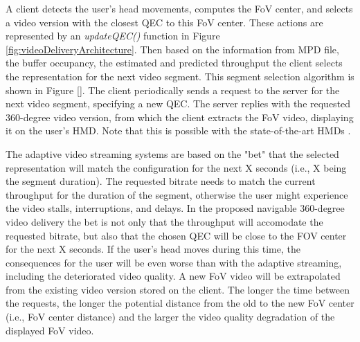 



A client detects the user's head movements, computes the FoV center, and selects a video version with the closest QEC to this FoV center. These actions are represented by an \textit{updateQEC()} function in Figure \ref{fig:videoDeliveryArchitecture}.  Then based on the information from MPD file, the buffer occupancy, the estimated and predicted throughput the client selects the representation for the next video segment. This segment selection algorithm is shown in Figure \ref{}. The client periodically sends a request to the server for the next video segment, specifying a new QEC. The server replies with the requested 360-degree video version, from which the client extracts the FoV video, displaying it on the user's HMD. Note that this is possible with the state-of-the-art HMDs \cite{}.

The adaptive video streaming systems are based on the "bet" that the selected representation will match the configuration for the next X seconds (i.e., X being the segment duration). The requested bitrate needs to match the current throughput for the duration of the segment, otherwise the user might experience the video stalls, interruptions, and delays. In the proposed navigable 360-degree video delivery the bet is not only that the throughput will accomodate the requested bitrate, but also that the chosen QEC will be close to the FOV center for the next X seconds. If the user's head moves during this time, the consequences for the user will be even worse than with the adaptive streaming, including the deteriorated video quality. A new FoV video will be extrapolated from the existing video version stored on the client. The longer the time between the requests, the longer the potential distance from the old to the new FoV center (i.e., FoV center distance) and the larger the video quality degradation of the displayed FoV video.

